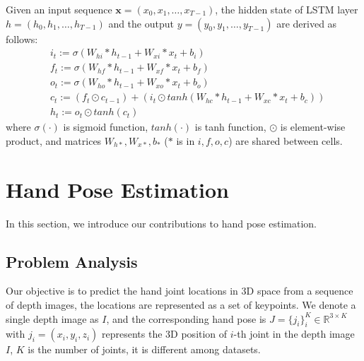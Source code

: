 \documentclass[journal,comsoc]{IEEEtran}
\begin{document}
Given an input sequence $\mathbf{x} = (x_0, x_1, \dots, x_{T-1})$, the hidden state of LSTM layer $h = (h_0, h_1, \dots, h_{T-1})$ 
and the output $y = (y_0, y_1, \dots, y_{T-1})$ are derived as follows\cite{zaremba2014learning}:
\begin{equation}
\begin{aligned}
&i_t := \sigma(W_{hi} * h_{t-1} + W_{xi} * x_t + b_i) \\
&f_t := \sigma(W_{hf} * h_{t-1} + W_{xf} * x_t + b_f) \\
&o_t := \sigma(W_{ho} * h_{t-1} + W_{xo} * x_t + b_o) \\
&c_t := (f_t \odot c_{t-1}) + (i_t \odot tanh(W_{hc} * h_{t-1} + W_{xc} * x_t + b_c)) \\
&h_t := o_t \odot tanh(c_t)
\end{aligned}
\end{equation}
where $\sigma(\cdot)$ is sigmoid function, $tanh(\cdot)$ is tanh function, $\odot$ is element-wise product, and matrices $W_{h*}, W_{x*}, b_{*}$ ($*$ is in $i, f, o, c$) are shared between cells.

\section{Hand Pose Estimation}\label{sec:hand pose estimation}
In this section, we introduce our contributions to hand pose estimation.

\subsection{Problem Analysis}\label{sec:problem analysis}
Our objective is to predict the hand joint locations in 3D space from a sequence of depth images,
the locations are represented as a set of keypoints. We denote a single depth image as $\mathit{I}$, and
the corresponding hand pose is
$\mathit{J}=\{\mathit{j}_i\}_i^K \in \mathbb{R}^{3 \times K}$ with $\mathit{j}_i=(x_i,y_i,z_i)$
represents the 3D position of $i$-th joint in the depth image $\mathit{I}$, $K$ is the number of joints,
it is different among datasets.
\end{document}
